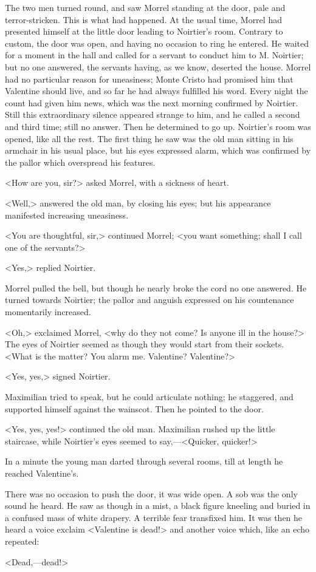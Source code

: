  The two men turned round, and saw Morrel standing at the door, pale and terror-stricken. This is what had happened. At the usual time, Morrel had presented himself at the little door leading to Noirtier's room. Contrary to custom, the door was open, and having no occasion to ring he entered. He waited for a moment in the hall and called for a servant to conduct him to M. Noirtier; but no one answered, the servants having, as we know, deserted the house. Morrel had no particular reason for uneasiness; Monte Cristo had promised him that Valentine should live, and so far he had always fulfilled his word. Every night the count had given him news, which was the next morning confirmed by Noirtier. Still this extraordinary silence appeared strange to him, and he called a second and third time; still no answer. Then he determined to go up. Noirtier's room was opened, like all the rest. The first thing he saw was the old man sitting in his armchair in his usual place, but his eyes expressed alarm, which was confirmed by the pallor which overspread his features. 

 <How are you, sir?> asked Morrel, with a sickness of heart. 

 <Well,> answered the old man, by closing his eyes; but his appearance manifested increasing uneasiness. 

 <You are thoughtful, sir,> continued Morrel; <you want something; shall I call one of the servants?> 

 <Yes,> replied Noirtier. 

 Morrel pulled the bell, but though he nearly broke the cord no one answered. He turned towards Noirtier; the pallor and anguish expressed on his countenance momentarily increased. 

 <Oh,> exclaimed Morrel, <why do they not come? Is anyone ill in the house?> The eyes of Noirtier seemed as though they would start from their sockets. <What is the matter? You alarm me. Valentine? Valentine?> 

 <Yes, yes,> signed Noirtier. 

 Maximilian tried to speak, but he could articulate nothing; he staggered, and supported himself against the wainscot. Then he pointed to the door. 

 <Yes, yes, yes!> continued the old man.  Maximilian rushed up the little staircase, while Noirtier's eyes seemed to say,—<Quicker, quicker!> 

 In a minute the young man darted through several rooms, till at length he reached Valentine's. 

 There was no occasion to push the door, it was wide open. A sob was the only sound he heard. He saw as though in a mist, a black figure kneeling and buried in a confused mass of white drapery. A terrible fear transfixed him. It was then he heard a voice exclaim <Valentine is dead!> and another voice which, like an echo repeated: 

 <Dead,—dead!>  